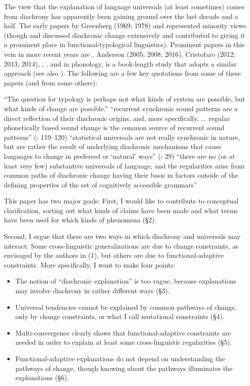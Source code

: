 \documentclass[output=paper]{langsci/langscibook}
\begin{document}
The view that the explanation of language universals (at least sometimes) comes from diachrony has apparently been gaining ground over the last decade and a half. The early papers by Greenberg (1969; 1978) and \citet{Bybee1988} represented minority views (though \citet{Givón1979} and \citet{Lehmann1982} discussed diachronic change extensively and contributed to giving it a prominent place in functional-typological linguistics). Prominent papers in this vein in more recent years are \citet{Aristar1991}, Anderson (2005; 2008; 2016), Cristofaro (2012; 2013; 2014), \citet{Creissels2008}, \citet{GildeaZúñiga2016}, and in phonology, \citet{Blevins2004} is a book-length study that adopts a similar approach (see also \citealt{Blevins2006}). The following are a few key quotations from some of these papers (and from some others):

\ea
  \ea  “The question for typology is perhaps not what kinds of system are possible, but what kinds of change are possible.” \citep[195]{Timberlake2003}
  \ex “recurrent synchronic sound patterns are a direct reflection of their diachronic origins, and, more specifically, ... regular phonetically based sound change is the common source of recurrent sound patterns” (\citealt{Blevins2006}: 119–120)
  \ex  “statistical universals are not really synchronic in nature, but are rather the result of underlying diachronic mechanisms that cause languages to change in preferred or ‘natural’ ways” (\citealt{BickelEtAl2015}: 29)
  \ex “there are no (or at least very few) substantive universals of language, and the regularities arise from common paths of diachronic change having their basis in factors outside of the defining properties of the set of cognitively accessible grammars” \citep[11]{Anderson2016}
  \z
\z

This paper has two major goals: First, I would like to contribute to conceptual clarification, sorting out what kinds of claims have been made and what terms have been used for which kinds of phenomena (§2).

Second, I argue that there are two ways in which diachrony and universals may interact: Some cross-linguistic generalizations are due to change constraints, as envisaged by the authors in (1), but others are due to functional-adaptive constraints. More specifically, I want to make four points:

\begin{itemize}
\item The notion of “diachronic explanation” is too vague, because explanations may involve diachrony in rather different ways (§3).
\item Universal tendencies cannot be explained by common pathways of change, only by change constraints, or what I call mutational constraints (§4).
\item Multi-convergence clearly shows that functional-adaptive constraints are needed in order to explain at least some cross-linguistic regularities (§5).
\item Functional-adaptive explanations do not depend on understanding the pathways of change, though knowing about the pathways illuminates the explanations (§6).
\end{itemize}
\end{document}
